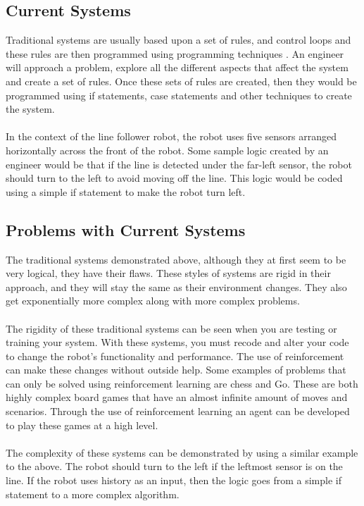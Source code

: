 \documentclass[a4paper,12pt]{article}
\begin{document}
\subsection{Current Systems}

Traditional systems are usually based upon a set of rules, and control loops and these rules are then programmed using programming techniques \cite{lakshmanababu2022exploring}. An engineer will approach a problem, explore all the different aspects that affect the system and create a set of rules. Once these sets of rules are created, then they would be programmed using if statements, case statements and other techniques to create the system.
\\\\
In the context of the line follower robot, the robot uses five sensors arranged horizontally across the front of the robot. Some sample logic created by an engineer would be that if the line is detected under the far-left sensor, the robot should turn to the left to avoid moving off the line. This logic would be coded using a simple if statement to make the robot turn left.

\subsection{Problems with Current Systems}

The traditional systems demonstrated above, although they at first seem to be very logical, they have their flaws. These styles of systems are rigid in their approach, and they will stay the same as their environment changes. They also get exponentially more complex along with more complex problems.
\\\\
The rigidity of these traditional systems can be seen when you are testing or training your system. With these systems, you must recode and alter your code to change the robot's functionality and performance. The use of reinforcement can make these changes without outside help. Some examples of problems that can only be solved using reinforcement learning are chess and Go. These are both highly complex board games that have an almost infinite amount of moves and scenarios. Through the use of reinforcement learning an agent can be developed to play these games at a high level.  
\\\\
The complexity of these systems can be demonstrated by using a similar example to the above. The robot should turn to the left if the leftmost sensor is on the line. If the robot uses history as an input, then the logic goes from a simple if statement to a more complex algorithm.
\end{document}

